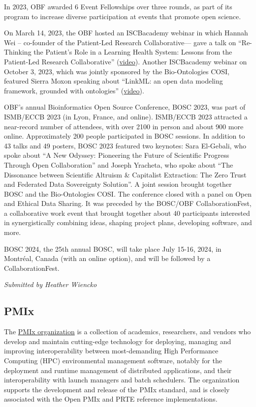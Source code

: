 \documentclass[a4paper]{report}
\begin{document}
In 2023, OBF awarded 6 Event Fellowships over three rounds, as part of its program to increase diverse participation at events that promote open science.

On March 14, 2023, the OBF hosted an ISCBacademy webinar in which Hannah Wei -- co-founder of the Patient-Led Research Collaborative–-- gave a talk on ``Re-Thinking the Patient's Role in a Learning Health System: Lessons from the Patient-Led Research Collaborative'' (\href{https://youtu.be/M2vAotWKd_Q}{video}). Another ISCBacademy webinar on October 3, 2023, which was jointly sponsored by the Bio-Ontologies COSI, featured Sierra Moxon speaking about ``LinkML: an open data modeling framework, grounded with ontologies'' (\href{https://youtu.be/CwyncsMMdNA}{video}).

OBF's annual Bioinformatics Open Source Conference, BOSC 2023, was part of ISMB/ECCB 2023 (in Lyon, France, and online). ISMB/ECCB 2023 attracted a near-record number of attendees, with over 2100 in person and about 900 more online. Approximately 200 people participated in BOSC sessions. In addition to 43 talks and 49 posters, BOSC 2023 featured two keynotes: Sara El-Gebali, who spoke about ``A New Odyssey: Pioneering the Future of Scientific Progress Through Open Collaboration'' and Joseph Yracheta, who spoke about ``The Dissonance between Scientific Altruism \& Capitalist Extraction: The Zero Trust and Federated Data Sovereignty Solution''. A joint session brought together BOSC and the Bio-Ontologies COSI. The conference closed with a panel on Open and Ethical Data Sharing. It was preceded by the BOSC/OBF CollaborationFest, a collaborative work event that brought together about 40 participants interested in synergistically combining ideas, shaping project plans, developing software, and more.

BOSC 2024, the 25th annual BOSC, will take place July 15-16, 2024, in Montréal, Canada (with an online option), and will be followed by a CollaborationFest.

{\em Submitted by Heather Wiencko}

\subsection{PMIx}

The \href{https://pmix.github.io/}{PMIx organization} is a collection of academics, researchers, and vendors who develop and maintain cutting-edge technology for deploying, managing and improving interoperability between most-demanding High Performance Computing (HPC) environmental management software, notably for the deployment and runtime management of distributed applications, and their interoperability with launch managers and batch schedulers. The organization supports the development and release of the PMIx standard, and is closely associated with the Open PMIx and PRTE reference implementations.
\end{document}
